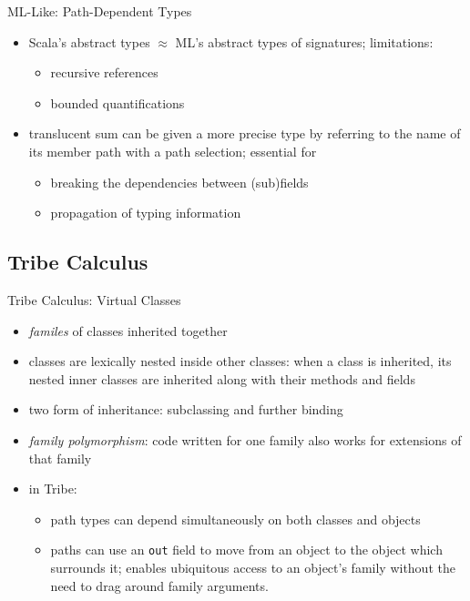 \documentclass{beamer}
\begin{document}
\begin{frame}{ML-Like: Path-Dependent Types}
\begin{itemize}
\item Scala's abstract types  $\approx$ ML's abstract types of signatures; limitations:
\begin{itemize}
\item recursive references
\item bounded quantifications
\end{itemize}
\item translucent sum can be given a more precise type by referring to the name of its member path with a path selection; essential for
\begin{itemize}
\item breaking the dependencies between (sub)fields
\item propagation of typing information
\end{itemize}
\end{itemize}
\end{frame}

\subsection{Tribe Calculus}

\begin{frame}{Tribe Calculus: Virtual Classes}
\begin{itemize}
\item {\it familes} of classes inherited together
\item classes are lexically nested inside other classes: when a class
  is inherited, its nested inner classes are inherited along with
  their methods and fields
\item two form of inheritance: subclassing and further binding
\item {\it family polymorphism}: code written for one family
  also works for extensions of that family
\item in Tribe:\begin{itemize}
\item path types can depend simultaneously on both classes and objects
\item paths can use an {\tt out} field to move from an object to the
  object which surrounds it; enables ubiquitous access to an object's
  family without the need to drag around family arguments.
\end{itemize}
\end{itemize}
\end{frame}
\end{document}
